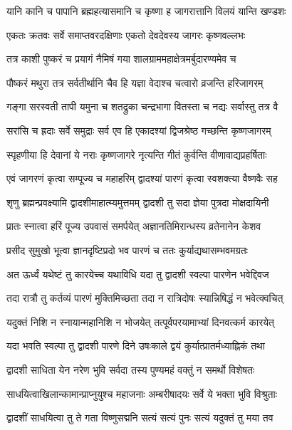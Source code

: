 \twolineshloka
{यानि कानि च पापानि ब्रह्महत्यासमानि च}
{कृष्णा ह जागरात्तानि विलयं यान्ति खण्डशः}%

\twolineshloka
{एकतः क्रतवः सर्वे समाप्तवरदक्षिणाः}
{एकतो देवदेवस्य जागरः कृष्णवल्लभः}%

\twolineshloka
{तत्र काशी पुष्करं च प्रयागं नैमिषं गया}
{शालग्राममहाक्षेत्रमर्बुदारण्यमेव च}%

\twolineshloka
{पौष्करं मथुरा तत्र सर्वतीर्थानि चैव हि}
{यज्ञा वेदाश्च चत्वारो व्रजन्ति हरिजागरम्}%

\twolineshloka
{गङ्गा सरस्वती तापी यमुना च शतद्रुका}
{चन्द्रभागा वितस्ता च नद्यः सर्वास्तु तत्र वै}%

\twolineshloka
{सरांसि च ह्रदाः सर्वे समुद्राः सर्व एव हि}
{एकादश्यां द्विजश्रेष्ठ गच्छन्ति कृष्णजागरम्}%

\twolineshloka
{स्पृहणीया हि देवानां ये नराः कृष्णजागरे}
{नृत्यन्ति गीतं कुर्वन्ति वीणावाद्यप्रहर्षिताः}%

\twolineshloka
{एवं जागरणं कृत्वा सम्पूज्य च महाहरिम्}
{द्वादश्यां पारणं कृत्वा स्वशक्त्या वैष्णवैः सह}%


\twolineshloka
{शृणु ब्रह्मन्प्रवक्ष्यामि द्वादशीमाहात्म्यमुत्तमम्}
{द्वादशी तु सदा ज्ञेया पुत्रदा मोक्षदायिनी}%

\twolineshloka
{प्रातः स्नात्वा हरिं पूज्य उपवासं समर्पयेत्}
{अज्ञानतिमिरान्धस्य व्रतेनानेन केशव}%

\twolineshloka
{प्रसीद सुमुखो भूत्वा ज्ञानदृष्टिप्रदो भव}
{पारणं च ततः कुर्याद्यथासम्भवमग्रतः}%

\twolineshloka
{अत ऊर्ध्वं यथेष्टं तु कारयेच्च यथाविधि}
{यदा तु द्वादशी स्वल्पा पारणेन भवेद्दिवज}%

\twolineshloka
{तदा रात्रौ तु कर्तव्यं पारणं मुक्तिमिच्छता}
{तदा न रात्रिदोषः स्यान्निषिद्धं न भवेत्क्वचित्}%

\twolineshloka
{यदुक्तं निशि न स्नायान्महानिशि न भोजयेत्}
{तत्पूर्वपरयामाभ्यां दिनवत्कर्म कारयेत्}%

\twolineshloka
{यदा भवति स्वल्पा तु द्वादशी पारणे दिने}
{उषःकाले  द्वयं कुर्यात्प्रातर्मध्याह्निकं तथा}%

\twolineshloka
{द्वादशी साधिता येन नरेण भुवि सर्वदा}
{तस्य पुण्यमहं वक्तुं न समर्थो विशेषतः}%

\twolineshloka
{साधयित्वाखिलान्कामान्प्राप्नुयुश्च महाजनाः}
{अम्बरीषादयः सर्वे ये भक्ता भुवि विश्रुताः}%

\twolineshloka
{द्वादशीं साधयित्वा तु ते गता विष्णुसद्मनि}
{सत्यं सत्यं पुनः सत्यं यदुक्तं तु मया तव}%

